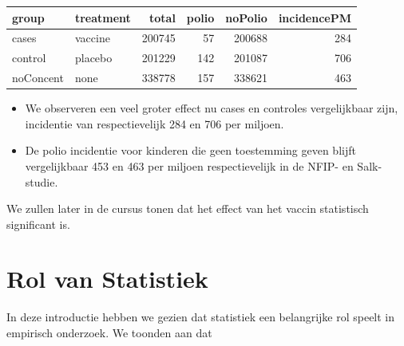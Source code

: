\documentclass[
  dutch,
  letterpaper,
  12pt]{book}
\newcounter{none} %
\theoremstyle{definition}
\theoremstyle{definition}
\theoremstyle{definition}
\theoremstyle{remark}
\begin{document}
\begin{tabular}{l|l|r|r|r|r}
\hline
group & treatment & total & polio & noPolio & incidencePM\\
\hline
cases & vaccine & 200745 & 57 & 200688 & 284\\
\hline
control & placebo & 201229 & 142 & 201087 & 706\\
\hline
noConcent & none & 338778 & 157 & 338621 & 463\\
\hline
\end{tabular}

\begin{itemize}
\item
  We observeren een veel groter effect nu cases en controles
  vergelijkbaar zijn, incidentie van respectievelijk 284 en 706 per
  miljoen.
\item
  De polio incidentie voor kinderen die geen toestemming geven blijft
  vergelijkbaar 453 en 463 per miljoen respectievelijk in de NFIP- en
  Salk-studie.
\end{itemize}

We zullen later in de cursus tonen dat het effect van het vaccin
statistisch significant is.

\section{Rol van Statistiek}\label{rol-van-statistiek}

In deze introductie hebben we gezien dat statistiek een belangrijke rol
speelt in empirisch onderzoek. We toonden aan dat
\end{document}
